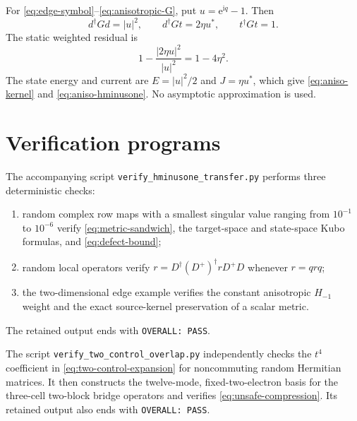 \documentclass[11pt]{article}
\theoremstyle{definition}
\theoremstyle{remark}
\newcommand{\I}{\mathrm i}
\newcommand{\e}{\mathrm e}
\newcommand{\abs}[1]{\left\lvert #1\right\rvert}
\begin{document}
For \eqref{eq:edge-symbol}--\eqref{eq:anisotropic-G}, put
$u=\e^{\I q}-1$.  Then
\begin{equation}
 d^\dagger Gd=\abs u^2,
 \qquad
 d^\dagger Gt=2\eta u^*,
 \qquad
 t^\dagger Gt=1.
\end{equation}
The static weighted residual is
\begin{equation}
 1-\frac{\abs{2\eta u}^2}{\abs u^2}=1-4\eta^2.
\end{equation}
The state energy and current are $E=\abs u^2/2$ and $J=\eta u^*$, which give
\eqref{eq:aniso-kernel} and \eqref{eq:aniso-hminusone}.  No asymptotic
approximation is used.

\section{Verification programs}

The accompanying script \texttt{verify\_hminusone\_transfer.py} performs three
deterministic checks:
\begin{enumerate}
\item random complex row maps with a smallest singular value ranging from
$10^{-1}$ to $10^{-6}$ verify \eqref{eq:metric-sandwich}, the target-space and
state-space Kubo formulas, and \eqref{eq:defect-bound};
\item random local operators verify
$r=D^\dagger(D^+)^{\dagger}rD^+D$ whenever $r=q r q$;
\item the two-dimensional edge example verifies the constant anisotropic
$H_{-1}$ weight and the exact source-kernel preservation of a scalar metric.
\end{enumerate}
The retained output ends with \texttt{OVERALL: PASS}.

The script \texttt{verify\_two\_control\_overlap.py} independently checks the
$t^4$ coefficient in \eqref{eq:two-control-expansion} for noncommuting random
Hermitian matrices.  It then constructs the twelve-mode, fixed-two-electron
basis for the three-cell two-block bridge operators and verifies
\eqref{eq:unsafe-compression}.  Its retained output also ends with
\texttt{OVERALL: PASS}.
\end{document}
